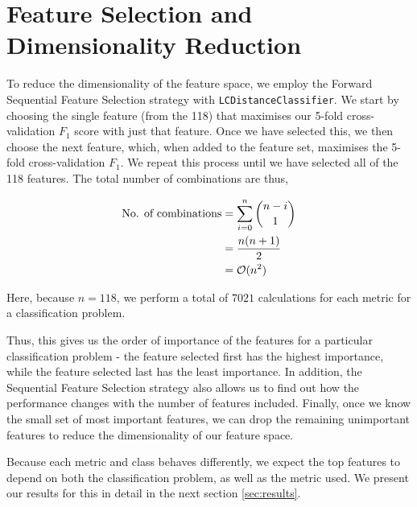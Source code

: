 \documentclass[conference]{IEEEtran}
\begin{document}
\section{Feature Selection and Dimensionality Reduction} \label{sec:feature_selection}

To reduce the dimensionality of the feature space, we employ the Forward Sequential Feature Selection strategy \cite{ferriComparativeStudyTechniques1994} with \texttt{LCDistanceClassifier}. We start by choosing the single feature (from the 118) that maximises our 5-fold cross-validation $F_1$ score with just that feature. Once we have selected this, we then choose the next feature, which, when added to the feature set, maximises the 5-fold cross-validation $F_1$. We repeat this process until we have selected all of the 118 features. The total number of combinations are thus,

\begin{align}
    \text{No. of combinations} &= \sum_{i=0}^{n} \binom{n-i}{1} \notag \\
    &=\frac{n(n+1)}{2} \label{eq:tot_sfs_calcs}\\
    &=\mathcal{O}(n^2) \label{eq:bigo_sfs}
\end{align}

Here, because $n=118$, we perform a total of $7021$ calculations for each metric for a classification problem.

Thus, this gives us the order of importance of the features for a particular classification problem - the feature selected first has the highest importance, while the feature selected last has the least importance. In addition, the Sequential Feature Selection strategy also allows us to find out how the performance changes with the number of features included. Finally, once we know the small set of most important features, we can drop the remaining unimportant features to reduce the dimensionality of our feature space.

Because each metric and class behaves differently, we expect the top features to depend on both the classification problem, as well as the metric used. We present our results for this in detail in the next section \ref{sec:results}.
\end{document}
